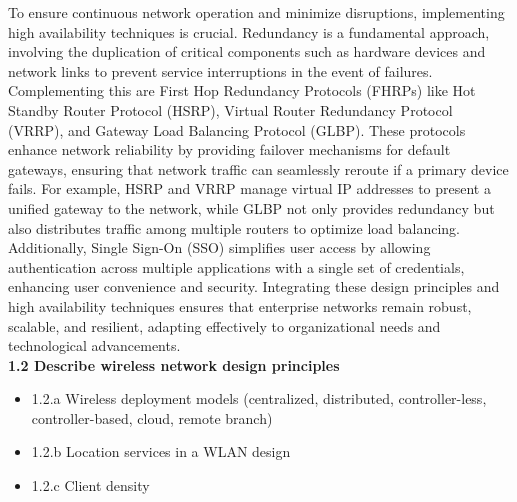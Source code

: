 \documentclass{article}
\begin{document}
	To ensure continuous network operation and minimize disruptions, implementing high availability techniques is crucial. Redundancy is a fundamental approach, involving the duplication of critical components such as hardware devices and network links to prevent service interruptions in the event of failures. Complementing this are First Hop Redundancy Protocols (FHRPs) like Hot Standby Router Protocol (HSRP), Virtual Router Redundancy Protocol (VRRP), and Gateway Load Balancing Protocol (GLBP). These protocols enhance network reliability by providing failover mechanisms for default gateways, ensuring that network traffic can seamlessly reroute if a primary device fails. For example, HSRP and VRRP manage virtual IP addresses to present a unified gateway to the network, while GLBP not only provides redundancy but also distributes traffic among multiple routers to optimize load balancing. Additionally, Single Sign-On (SSO) simplifies user access by allowing authentication across multiple applications with a single set of credentials, enhancing user convenience and security. Integrating these design principles and high availability techniques ensures that enterprise networks remain robust, scalable, and resilient, adapting effectively to organizational needs and technological advancements.\\

\textbf{1.2 Describe wireless network design principles}
\begin{itemize}
\item 1.2.a Wireless deployment models (centralized, distributed, controller-less, controller-based, cloud, remote branch)
\item 1.2.b Location services in a WLAN design
\item 1.2.c Client density
\end{itemize}
\end{document}
